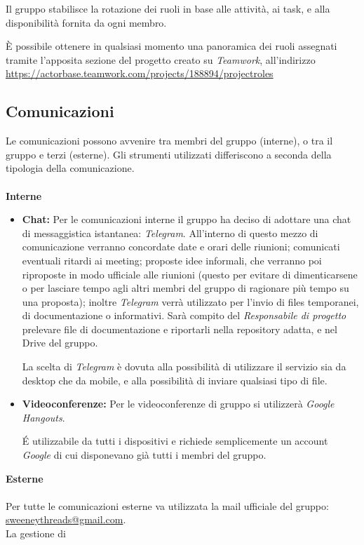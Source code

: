 \documentclass[a4paper]{report}
\begin{document}
	Il gruppo stabilisce la rotazione dei ruoli in base alle attività, ai task, e alla disponibilità fornita da ogni membro.
	
	È possibile ottenere in qualsiasi momento una panoramica dei ruoli assegnati tramite l'apposita sezione del 
	progetto creato su \emph{Teamwork}, all'indirizzo\\ \url{https://actorbase.teamwork.com/projects/188894/projectroles} 
	\subsection{Comunicazioni}
	Le comunicazioni possono avvenire tra membri del gruppo (interne), o tra il gruppo e terzi (esterne). Gli
	strumenti utilizzati differiscono a seconda della tipologia della comunicazione. \\ \\
	\textbf{Interne} 
	\begin{itemize}
		\item \textbf{Chat:} Per le comunicazioni interne il gruppo ha deciso di adottare una chat di messaggistica 
		istantanea: \emph{Telegram}. All'interno di questo mezzo di comunicazione verranno concordate date e orari 
		delle riunioni; comunicati eventuali ritardi ai meeting; proposte idee informali, che verranno poi riproposte 
		in modo ufficiale alle riunioni (questo per evitare di dimenticarsene o per lasciare tempo agli altri membri 
		del gruppo di ragionare più tempo su una proposta); inoltre \emph{Telegram} verrà utilizzato per l'invio di files
		temporanei, di documentazione o informativi. Sarà compito del \emph{Responsabile di progetto} prelevare file di documentazione 
		e riportarli nella repository adatta, e nel Drive del gruppo.
		
		La scelta di \emph{Telegram} è dovuta alla possibilità di utilizzare il servizio sia da desktop che da mobile, e alla 
		possibilità di inviare qualsiasi tipo di file.
		\item \textbf{Videoconferenze:} Per le videoconferenze di gruppo si utilizzerà \emph{Google Hangouts}. 
		
		\'E utilizzabile da tutti i dispositivi e richiede semplicemente un account \emph{Google} di cui disponevano 
		già tutti i membri del gruppo.
	\end{itemize}
	\textbf{Esterne}  \\ \\ 
	Per tutte le comunicazioni esterne va utilizzata la mail ufficiale del gruppo: \href{mailto:sweeneythreads@gmail.com}{sweeneythreads@gmail.com}. \\ La gestione di 
\end{document}
